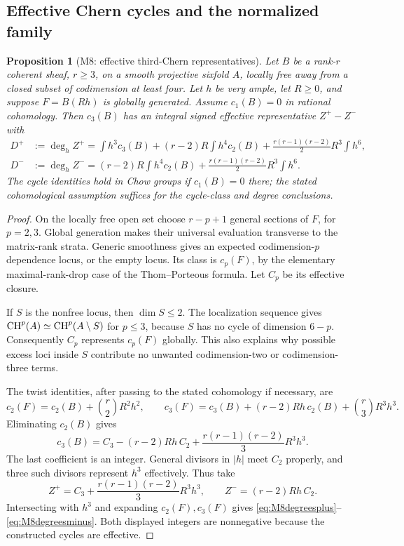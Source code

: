 \documentclass[11pt,a4paper]{article}
\newtheorem{proposition}[theorem]{Proposition}
\theoremstyle{definition}\newtheorem{definition}[theorem]{Definition}
\theoremstyle{remark}\newtheorem{remark}[theorem]{Remark}
\begin{document}
\subsection{Effective Chern cycles and the normalized family}

\begin{proposition}[M8: effective third-Chern representatives]\label{M8}
Let $B$ be a rank-$r$ coherent sheaf, $r\ge3$, on a smooth projective sixfold $A$,
locally free away from a closed subset of codimension at least four.
Let $h$ be very ample, let $R\ge0$, and suppose $F=B(Rh)$ is globally
generated. Assume $c_1(B)=0$ in rational cohomology. Then $c_3(B)$ has
an integral signed effective representative $Z^+-Z^-$ with
\begin{align}
 D^+&:=\deg_h Z^+
   =\int h^3c_3(B)+(r-2)R\int h^4c_2(B)
       +\frac{r(r-1)(r-2)}2R^3\int h^6,\label{eq:M8degreesplus}\\
 D^-&:=\deg_h Z^-
   =(r-2)R\int h^4c_2(B)
       +\frac{r(r-1)(r-2)}2R^3\int h^6.\label{eq:M8degreesminus}
\end{align}
The cycle identities hold in Chow groups if $c_1(B)=0$ there; the
stated cohomological assumption suffices for the cycle-class and
degree conclusions.
\end{proposition}
\begin{proof}
On the locally free open set choose $r-p+1$ general sections of $F$,
for $p=2,3$. Global generation makes their universal evaluation
transverse to the matrix-rank strata. Generic smoothness gives an
expected codimension-$p$ dependence locus, or the empty locus.
Its class is $c_p(F)$, by the elementary maximal-rank-drop case of
the Thom--Porteous formula. Let $C_p$ be its effective closure.

If $S$ is the nonfree locus, then $\dim S\le2$.
The localization sequence gives
$\operatorname{CH}^p(A)\simeq\operatorname{CH}^p(A\setminus S)$ for $p\le3$, because
$S$ has no cycle of dimension $6-p$. Consequently $C_p$ represents
$c_p(F)$ globally. This also explains why possible excess loci
inside $S$ contribute no unwanted codimension-two or codimension-three
terms.

The twist identities, after passing to the stated cohomology if
necessary, are
\[
 c_2(F)=c_2(B)+\binom r2R^2h^2,\qquad
 c_3(F)=c_3(B)+(r-2)Rh\,c_2(B)+\binom r3R^3h^3.
\]
Eliminating $c_2(B)$ gives
\begin{equation}\label{eq:M8cycleidentity}
 c_3(B)=C_3-(r-2)Rh\,C_2+
                \frac{r(r-1)(r-2)}3R^3h^3.
\end{equation}
The last coefficient is an integer. General divisors in $|h|$ meet
$C_2$ properly, and three such divisors represent $h^3$ effectively.
Thus take
\[
 Z^+=C_3+\frac{r(r-1)(r-2)}3R^3h^3,\qquad
 Z^-=(r-2)Rh\,C_2.
\]
Intersecting with $h^3$ and expanding $c_2(F),c_3(F)$ gives
\eqref{eq:M8degreesplus}--\eqref{eq:M8degreesminus}.
Both displayed integers are nonnegative because the constructed
cycles are effective.
\end{proof}
\end{document}
